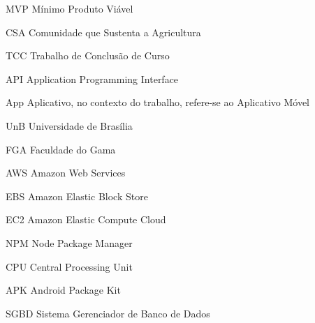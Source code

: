 \begin{siglas}
  \item[MVP] Mínimo Produto Viável
  \item[CSA] Comunidade que Sustenta a Agricultura
  \item[TCC] Trabalho de Conclusão de Curso
  \item[API] Application Programming Interface
  \item[App] Aplicativo, no contexto do trabalho, refere-se ao Aplicativo Móvel
  \item[UnB] Universidade de Brasília
  \item[FGA] Faculdade do Gama
  \item[AWS] Amazon Web Services
  \item[EBS] Amazon Elastic Block Store
  \item[EC2] Amazon Elastic Compute Cloud
  \item[NPM] Node Package Manager
  \item[CPU] Central Processing Unit
  \item[APK] Android Package Kit
  \item[SGBD] Sistema Gerenciador de Banco de Dados
\end{siglas}
